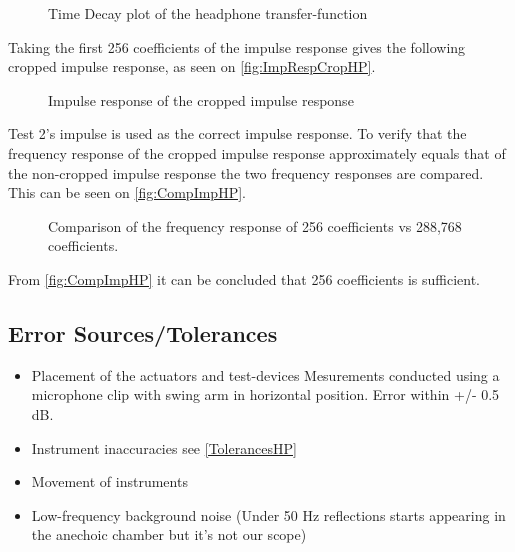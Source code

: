 \begin{figure}[H]
	\centering
	
	\caption{Time Decay plot of the headphone transfer-function}
	\label{TimeDecayPlotHeadphone}
\end{figure}

Taking the first 256 coefficients of the impulse response gives the following cropped impulse response, as seen on \autoref{fig:ImpRespCropHP}.

\begin{figure}[H]
	\centering
	
	\caption{Impulse response of the cropped impulse response}
	\label{fig:ImpRespCropHP}
\end{figure}

Test 2's impulse is used as the correct impulse response. To verify that the frequency response of the cropped impulse response approximately equals that of the non-cropped impulse response the two frequency responses are compared. This can be seen on \autoref{fig:CompImpHP}.

\begin{figure}[H]
	\centering
	
	\caption{Comparison of the frequency response of 256 coefficients vs 288,768 coefficients.}
	\label{fig:CompImpHP}
\end{figure}

From \autoref{fig:CompImpHP} it can be concluded that 256 coefficients is sufficient.


\subsection{Error Sources/Tolerances}
\begin{itemize}
	\item Placement of the actuators and test-devices Mesurements conducted using a microphone clip with swing arm in horizontal position. Error within +/- 0.5 dB. \citep{BK1985}	
	\item Instrument inaccuracies see \autoref{TolerancesHP}
	\item Movement of instruments 
	\item Low-frequency background noise (Under 50 Hz reflections starts appearing in the anechoic chamber but it's not our scope)
\end{itemize}


